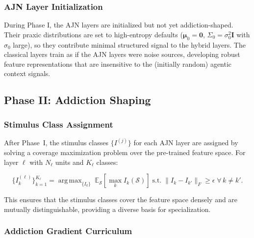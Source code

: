\documentclass[12pt,a4paper]{article}
\DeclareMathOperator{\argmax}{arg\,max}
\begin{document}
\subsubsection{AJN Layer Initialization}

During Phase I, the AJN layers are initialized but not yet addiction-shaped.
Their praxic distributions are set to high-entropy defaults
($\boldsymbol{\mu}_0 = \mathbf{0}$, $\Sigma_0 = \sigma_0^2 \mathbf{I}$ with
$\sigma_0$ large), so they contribute minimal structured signal to the
hybrid layers. The classical layers train as if the AJN layers were noise
sources, developing robust feature representations that are insensitive to
the (initially random) agentic context signals.

\subsection{Phase II: Addiction Shaping}

\subsubsection{Stimulus Class Assignment}

After Phase~I, the stimulus classes $\{I^{(j)}\}$ for each AJN layer are
assigned by solving a coverage maximization problem over the pre-trained
feature space. For layer $\ell$ with $N_\ell$ units and $K_\ell$ classes:

\begin{equation}
  \{I_k^{(\ell)}\}_{k=1}^{K_\ell} = \argmax_{\{I_k\}}
    \;\mathbb{E}_{\mathcal{S}}\!\left[\max_k I_k(\mathcal{S})\right]
    \;\text{s.t.}\; \|I_k - I_{k'}\|_F \geq \epsilon \;\forall\, k\neq k'.
  \label{eq:stimulus_assignment}
\end{equation}

This ensures that the stimulus classes cover the feature space densely and
are mutually distinguishable, providing a diverse basis for specialization.

\subsubsection{Addiction Gradient Curriculum}
\end{document}
